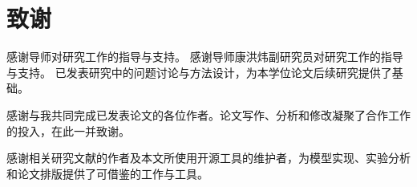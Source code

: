 \chapter{致谢}

\ifdefined\YNUAnonymous
感谢导师对研究工作的指导与支持。
\else
感谢导师康洪炜副研究员对研究工作的指导与支持。
\fi
已发表研究中的问题讨论与方法设计，为本学位论文后续研究提供了基础。

感谢与我共同完成已发表论文的各位作者。论文写作、分析和修改凝聚了合作工作的投入，在此一并致谢。

感谢相关研究文献的作者及本文所使用开源工具的维护者，为模型实现、实验分析和论文排版提供了可借鉴的工作与工具。
